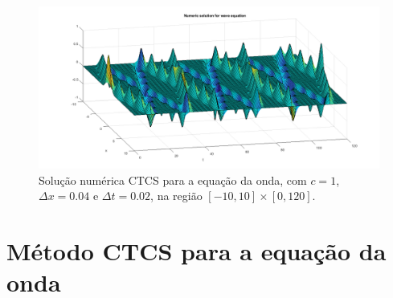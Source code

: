 \documentclass{article}
\begin{document}
\begin{itemize}
            \begin{figure}[!h]
                \centerline{
                    \includegraphics[width=1.4\textwidth]{images/wave_3.png}
                }
                \caption{Solução numérica CTCS para a equação da onda, com $c = 1$,
                $\Delta x = 0.04$ e $\Delta t = 0.02$, na região $[-10, 10] \times [0, 120]$.}
                \label{fig:wave_3}
            \end{figure}
    \end{itemize}

    \clearpage

    \appendix

    \section{Método CTCS para a equação da onda}
        \label{appendix:ctcs}
\end{document}
